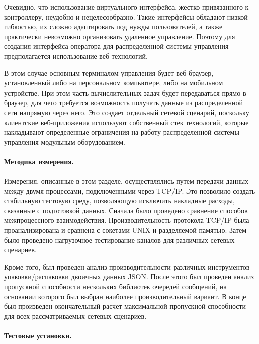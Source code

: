 \begin{enumerate}
Очевидно, что использование виртуального интерфейса, жестко привязанного к контроллеру, неудобно и нецелесообразно. Такие интерфейсы обладают низкой гибкостью, их сложно адаптировать под нужды пользователей, а также практически невозможно организовать удаленное управление. Поэтому для создания интерфейса оператора для распределенной системы управления предполагается использование веб-технологий.

В этом случае основным терминалом управления будет веб-браузер, установленный либо на персональном компьютере, либо на мобильном устройстве. При этом часть вычислительных задач будет передаваться прямо в браузер, для чего требуется возможность получать данные из распределенной сети напрямую через него. Это создает отдельный сетевой сценарий, поскольку клиентские веб-приложения используют собственный стек технологий, которые накладывают определенные ограничения на работу распределенной системы управления модульным оборудованием.

\end{enumerate}

\paragraph{Методика измерения.}
\label{sec:methodology}

Измерения, описанные в этом разделе, осуществлялись путем передачи данных между двумя процессами, подключенными через TCP/IP. Это позволило создать стабильную тестовую среду, позволяющую исключить накладные расходы, связанные с подготовкой данных. Сначала было проведено сравнение способов межпроцессного взаимодействия. Производительность протокола TCP/IP была проанализирована и сравнена с сокетами UNIX и разделяемой памятью. Затем было проведено нагрузочное тестирование каналов для различных сетевых сценариев.

Кроме того, был проведен анализ производительности различных инструментов упаковки/распаковки двоичных данных JSON. После этого был проведен анализ пропускной способности нескольких библиотек очередей сообщений, на основании которого был выбран наиболее производительный вариант. В конце был произведен окончательный расчет максимальной пропускной способности для всех рассматриваемых сетевых сценариев.

\paragraph{Тестовые установки.}

